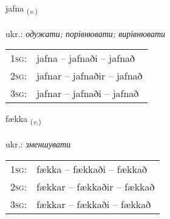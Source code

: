 \documentclass[frontgrid, backgrid]{flacards}\usepackage[]{graphicx}\usepackage[]{xcolor}
\begin{document}
\renewcommand{\flhead}{\vskip5pt \fboxsep=0pt {\small\bfseries\footnotesize Sagnorð | дієслово}}
\renewcommand{\fcfoot}{\vskip5pt \fboxsep=0pt \hspace{2pt}{\small\bfseries\footnotesize 2K}}

\renewcommand{\blhead}{\vskip5pt {\small\bfseries\footnotesize Sagnorð | дієслово }}
\renewcommand{\bcfoot}{\vskip5pt \hspace{2pt}{\small\bfseries\footnotesize 2K}}


{jafna \small{\textsubscript{(\textit{v.})}} \\[1ex] %
\textphonetic{[japna]} \\
ukr.: \emph{одужати; порівнювати; вирівнювати} \\  [2ex]
\renewcommand*{\arraystretch}{0.8}
\begin{tabular}{p{1cm}l}
\textsc{1sg}: & jafna -- jafnaði -- jafnað \\ 
\textsc{2sg}: & jafnar -- jafnaðir -- jafnað \\ 
\textsc{3sg}: & jafnar -- jafnaði -- jafnað \\ 
\end{tabular}
}

\renewcommand{\flhead}{\vskip5pt \fboxsep=0pt {\small\bfseries\footnotesize Sagnorð | дієслово}}
\renewcommand{\fcfoot}{\vskip5pt \fboxsep=0pt \hspace{2pt}{\small\bfseries\footnotesize 2K}}

\renewcommand{\blhead}{\vskip5pt {\small\bfseries\footnotesize Sagnorð | дієслово }}
\renewcommand{\bcfoot}{\vskip5pt \hspace{2pt}{\small\bfseries\footnotesize 2K}}


{fækka \small{\textsubscript{(\textit{v.})}} \\[1ex] %
\textphonetic{[faihka]} \\
ukr.: \emph{зменшувати} \\  [2ex]
\renewcommand*{\arraystretch}{0.8}
\begin{tabular}{p{1cm}l}
\textsc{1sg}: & fækka -- fækkaði -- fækkað \\ 
\textsc{2sg}: & fækkar -- fækkaðir -- fækkað \\ 
\textsc{3sg}: & fækkar -- fækkaði -- fækkað \\ 
\end{tabular}
}
\end{document}
